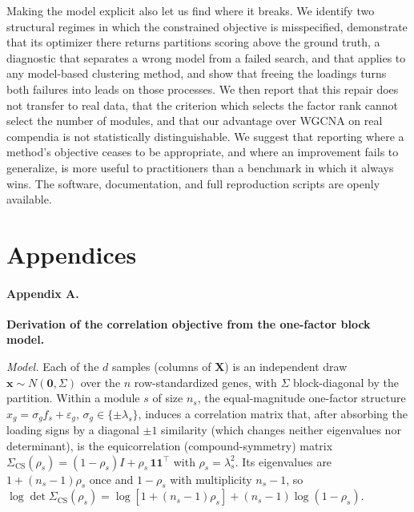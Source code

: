 Making the model explicit also let us find where it breaks. We identify two
structural regimes in which the constrained objective is misspecified,
demonstrate that its optimizer there returns partitions scoring above the ground
truth, a diagnostic that separates a wrong model from a failed search, and that
applies to any model-based clustering method, and show that freeing the loadings
turns both failures into leads on those processes. We then report that this
repair does not transfer to real data, that the criterion which selects the
factor rank cannot select the number of modules, and that our advantage over
WGCNA on real compendia is not statistically distinguishable. We suggest that
reporting where a method's objective ceases to be appropriate, and where an
improvement fails to generalize, is more useful to practitioners than a benchmark
in which it always wins. The software, documentation, and full reproduction
scripts are openly available.

\section*{Appendices}

\paragraph*{Appendix A.}
\textbf{Derivation of the correlation objective from the one-factor block model.}

\emph{Model.} Each of the $d$ samples (columns of $\mathbf{X}$) is an
independent draw $\mathbf{x}\sim N(\mathbf{0},\Sigma)$ over the $n$
row-standardized genes, with $\Sigma$ block-diagonal by the partition. Within a
module $s$ of size $n_s$, the equal-magnitude one-factor structure
$x_g=\sigma_g f_s+\varepsilon_g$, $\sigma_g\in\{\pm\lambda_s\}$, induces a
correlation matrix that, after absorbing the loading signs by a diagonal
$\pm1$ similarity (which changes neither eigenvalues nor determinant), is the
equicorrelation (compound-symmetry) matrix
$\Sigma_{\mathrm{CS}}(\rho_s)=(1-\rho_s)I+\rho_s\,\mathbf{1}\mathbf{1}^{\!\top}$
with $\rho_s=\lambda_s^2$. Its eigenvalues are $1+(n_s-1)\rho_s$ once and
$1-\rho_s$ with multiplicity $n_s-1$, so
$\log\det\Sigma_{\mathrm{CS}}(\rho_s)=\log[1+(n_s-1)\rho_s]+(n_s-1)\log(1-\rho_s)$.

